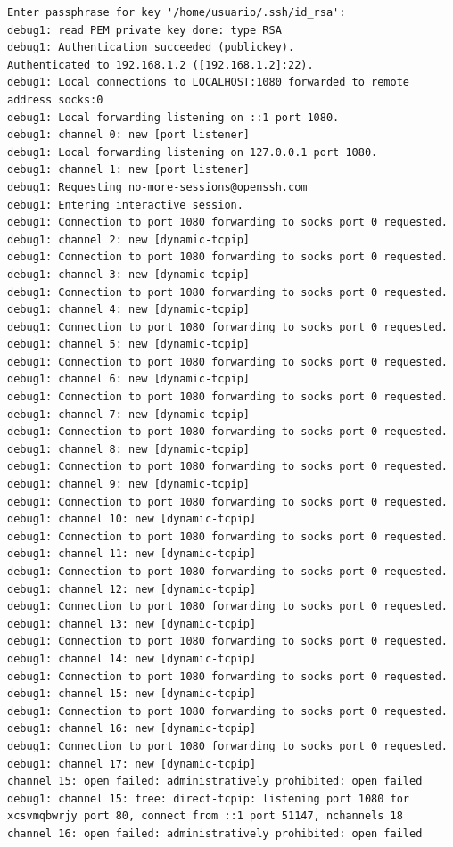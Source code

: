 \documentclass[11pt]{article}
\begin{document}
\begin{lstlisting}
Enter passphrase for key '/home/usuario/.ssh/id_rsa': 
debug1: read PEM private key done: type RSA
debug1: Authentication succeeded (publickey).
Authenticated to 192.168.1.2 ([192.168.1.2]:22).
debug1: Local connections to LOCALHOST:1080 forwarded to remote address socks:0
debug1: Local forwarding listening on ::1 port 1080.
debug1: channel 0: new [port listener]
debug1: Local forwarding listening on 127.0.0.1 port 1080.
debug1: channel 1: new [port listener]
debug1: Requesting no-more-sessions@openssh.com
debug1: Entering interactive session.
debug1: Connection to port 1080 forwarding to socks port 0 requested.
debug1: channel 2: new [dynamic-tcpip]
debug1: Connection to port 1080 forwarding to socks port 0 requested.
debug1: channel 3: new [dynamic-tcpip]
debug1: Connection to port 1080 forwarding to socks port 0 requested.
debug1: channel 4: new [dynamic-tcpip]
debug1: Connection to port 1080 forwarding to socks port 0 requested.
debug1: channel 5: new [dynamic-tcpip]
debug1: Connection to port 1080 forwarding to socks port 0 requested.
debug1: channel 6: new [dynamic-tcpip]
debug1: Connection to port 1080 forwarding to socks port 0 requested.
debug1: channel 7: new [dynamic-tcpip]
debug1: Connection to port 1080 forwarding to socks port 0 requested.
debug1: channel 8: new [dynamic-tcpip]
debug1: Connection to port 1080 forwarding to socks port 0 requested.
debug1: channel 9: new [dynamic-tcpip]
debug1: Connection to port 1080 forwarding to socks port 0 requested.
debug1: channel 10: new [dynamic-tcpip]
debug1: Connection to port 1080 forwarding to socks port 0 requested.
debug1: channel 11: new [dynamic-tcpip]
debug1: Connection to port 1080 forwarding to socks port 0 requested.
debug1: channel 12: new [dynamic-tcpip]
debug1: Connection to port 1080 forwarding to socks port 0 requested.
debug1: channel 13: new [dynamic-tcpip]
debug1: Connection to port 1080 forwarding to socks port 0 requested.
debug1: channel 14: new [dynamic-tcpip]
debug1: Connection to port 1080 forwarding to socks port 0 requested.
debug1: channel 15: new [dynamic-tcpip]
debug1: Connection to port 1080 forwarding to socks port 0 requested.
debug1: channel 16: new [dynamic-tcpip]
debug1: Connection to port 1080 forwarding to socks port 0 requested.
debug1: channel 17: new [dynamic-tcpip]
channel 15: open failed: administratively prohibited: open failed
debug1: channel 15: free: direct-tcpip: listening port 1080 for xcsvmqbwrjy port 80, connect from ::1 port 51147, nchannels 18
channel 16: open failed: administratively prohibited: open failed

\end{lstlisting}
\end{document}
